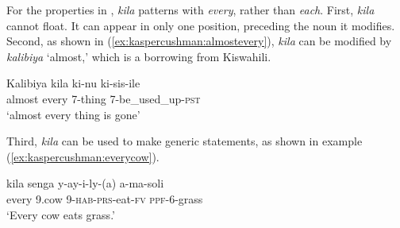 \documentclass[letterpaper, 12pt]{article}
\begin{document}
For the properties in , \textit{kila} patterns with \textit{every}, rather than \textit{each}.  First, \textit{kila} cannot float. It can appear in only one position, preceding the noun it modifies. Second, as shown in (\ref{ex:kaspercushman:almostevery}), \textit{kila} can be modified by \textit{kalibiya} `almost,' which is a borrowing from Kiswahili. 

\begin{exe}
\ex \gll Kalibiya kila ki-nu ki-sis-ile     \\
almost every 7-thing 7-be\_used\_up-\textsc{pst} \\
`almost every thing is gone' \\ \label{ex:kaspercushman:almostevery}
\end{exe}

Third, \emph{kila} can be used to make generic statements, as shown in example (\ref{ex:kaspercushman:everycow}).

\begin{exe}
\singlespacing

\ex \gll kila senga y-ay-i-ly-(a) a-ma-soli \label{ex:kaspercushman:everycow}\\
every 9.cow 9-\textsc{hab}-\textsc{prs}-eat-\textsc{fv} \textsc{ppf}-6-grass \\
`Every cow eats grass.' 

\end{exe}
\end{document}
